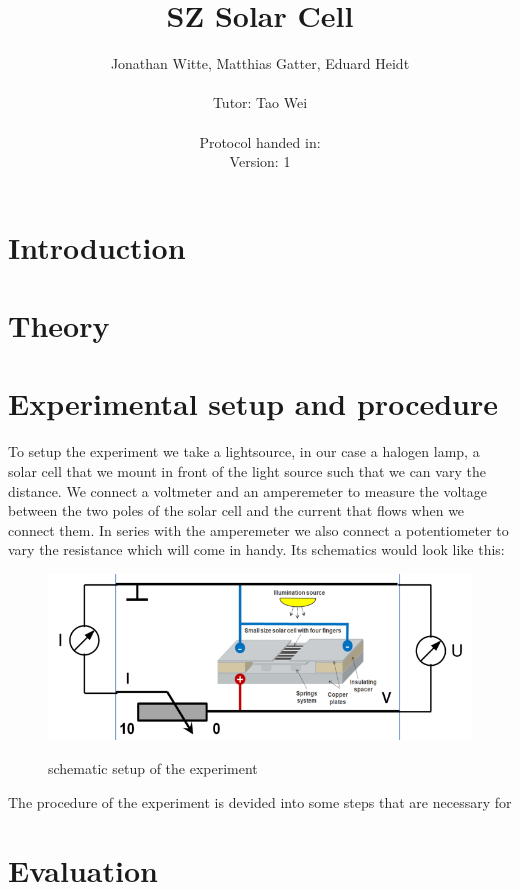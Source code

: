 \documentclass[12pt]{scrartcl}
\title{SZ Solar Cell}
\author{Jonathan Witte, Matthias Gatter, Eduard Heidt\\ \\
	Tutor: Tao Wei\\ \\
	Protocol handed in: \\
	Version: 1}
\date{}
\begin{document}
	
	\maketitle
	\newpage
	
	
	\tableofcontents
	\newpage
	
	
	\ohead{\pagemark}
	
	\newpage
	
	\section{Introduction}
	
	\section{Theory}
	
	\section{Experimental setup and procedure}
		To setup the experiment we take a lightsource, in our case a halogen lamp, a solar cell that we mount in front of the light source such that we can vary the distance. We connect a voltmeter and an amperemeter to measure the voltage between the two poles of the solar cell and the current that flows when we connect them. In series with the amperemeter we also connect a potentiometer to vary the resistance which will come in handy. Its schematics would look like this:
		
		\begin{figure}[h]
			\centering
			\includegraphics[width = 0.7 \linewidth]{Bilder/Schaltung.png}
			\label{Schaltung}
			\caption{schematic setup of the experiment}
		\end{figure}
	
		The procedure of the experiment is devided into some steps that are necessary for 
	\section{Evaluation}
	
\end{document}
